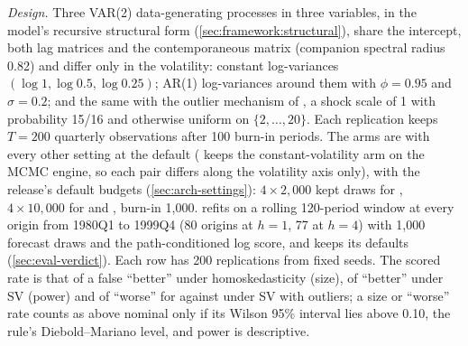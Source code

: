 \emph{Design.} Three VAR(2) data-generating processes in three variables, in the model's recursive
structural form (\cref{sec:framework:structural}), share the intercept, both lag matrices and the
contemporaneous matrix (companion spectral radius 0.82) and differ only in the volatility: constant
log-variances $(\log 1, \log 0.5, \log 0.25)$; AR(1) log-variances around them with $\phi = 0.95$ and
$\sigma = 0.2$; and the same with the outlier mechanism of , a shock scale of
1 with probability 15/16 and otherwise uniform on $\{2, \ldots, 20\}$. Each replication keeps
$T = 200$ quarterly observations after 100 burn-in periods. The arms are 
with every other setting at the default ( keeps the constant-volatility arm on
the MCMC engine, so each pair differs along the volatility axis only), with the release's default budgets
(\cref{sec:arch-settings}):
$4 \times 2{,}000$ kept draws for , $4 \times 10{,}000$ for  and
, burn-in 1,000.  refits on a rolling 120-period window at every
origin from 1980Q1 to 1999Q4 (80 origins at $h = 1$, 77 at $h = 4$) with 1,000 forecast draws and the
path-conditioned log score, and  keeps its defaults (\cref{sec:eval-verdict}). Each
row has 200 replications from fixed seeds. The scored rate is that of a false ``better'' under
homoskedasticity (size), of ``better'' under SV (power) and of ``worse'' for 
against  under SV with outliers; a size or ``worse'' rate counts as above nominal only if its
Wilson 95\% interval lies above 0.10, the rule's Diebold--Mariano level, and power is descriptive.

\begin{table}[!htbp]
\centering\footnotesize
\caption{Size and power of the verdict rule on simulated data, after the release
(\cref{app:dgp}): the rate of the scored verdict over 200 replications per row, and the verdict
counts with the convergence gate on (the engine's verdict) and off.}
\label{tab:TabDdgp}

\end{table}

